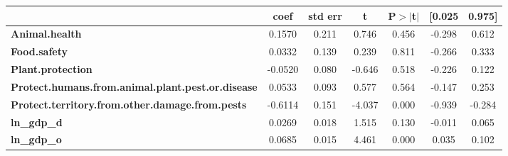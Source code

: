\begin{center}
\begin{tabular}{lcccccc}
                                                          & \textbf{coef} & \textbf{std err} & \textbf{t} & \textbf{P$> |$t$|$} & \textbf{[0.025} & \textbf{0.975]}  \\
\midrule
\textbf{Animal.health}                                    &       0.1570  &        0.211     &     0.746  &         0.456        &       -0.298    &        0.612     \\
\textbf{Food.safety}                                      &       0.0332  &        0.139     &     0.239  &         0.811        &       -0.266    &        0.333     \\
\textbf{Plant.protection}                                 &      -0.0520  &        0.080     &    -0.646  &         0.518        &       -0.226    &        0.122     \\
\textbf{Protect.humans.from.animal.plant.pest.or.disease} &       0.0533  &        0.093     &     0.577  &         0.564        &       -0.147    &        0.253     \\
\textbf{Protect.territory.from.other.damage.from.pests}   &      -0.6114  &        0.151     &    -4.037  &         0.000        &       -0.939    &       -0.284     \\
\textbf{ln\_gdp\_d}                                       &       0.0269  &        0.018     &     1.515  &         0.130        &       -0.011    &        0.065     \\
\textbf{ln\_gdp\_o}                                       &       0.0685  &        0.015     &     4.461  &         0.000        &        0.035    &        0.102     \\
\bottomrule
\end{tabular}
\end{center}